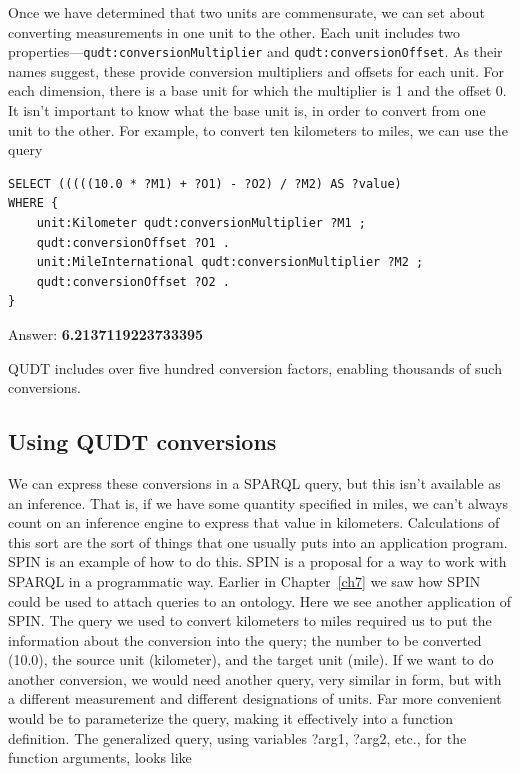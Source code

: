 Once we have determined that two units are commensurate, we can set
about converting measurements in one unit to the other. Each unit
includes two properties---\texttt{qudt:conversionMultiplier} and
\texttt{qudt:conversionOffset}. As their names suggest, these provide conversion
multipliers and offsets for each unit. For each dimension, there is a
base unit for which the multiplier is 1 and the offset 0. It isn't
important to know what the base unit is, in order to convert from one
unit to the other. For example, to convert ten kilometers to miles, we
can use the query

\begin{lstlisting}
SELECT (((((10.0 * ?M1) + ?O1) - ?O2) / ?M2) AS ?value)
WHERE {
    unit:Kilometer qudt:conversionMultiplier ?M1 ;
    qudt:conversionOffset ?O1 .
    unit:MileInternational qudt:conversionMultiplier ?M2 ;
    qudt:conversionOffset ?O2 .
}
\end{lstlisting}

Answer: \textbf{6.2137119223733395}

QUDT includes over five hundred conversion factors, enabling thousands
of such conversions.

\subsection{Using QUDT conversions}

We can express these conversions in a SPARQL query, but this isn't
available as an inference. That is, if we have some quantity specified
in miles, we can't always count on an inference engine to express that
value in kilometers. Calculations of this sort are the sort of things
that one usually puts into an application program. SPIN is an example of
how to do this. SPIN is a proposal for a way to work with SPARQL in a
programmatic way. Earlier in Chapter~\ref{ch7} we saw how SPIN could be used to
attach queries to an ontology. Here we see another application of SPIN.
The query we used to convert kilometers to miles required us to put the
information about the conversion into the query; the number to be
converted (10.0), the source unit (kilometer), and the target unit
(mile). If we want to do another conversion, we would need another
query, very similar in form, but with a different measurement and
different designations of units. Far more convenient would be to
parameterize the query, making it effectively into a function
definition. The generalized query, using variables ?arg1, ?arg2, etc.,
for the function arguments, looks like

